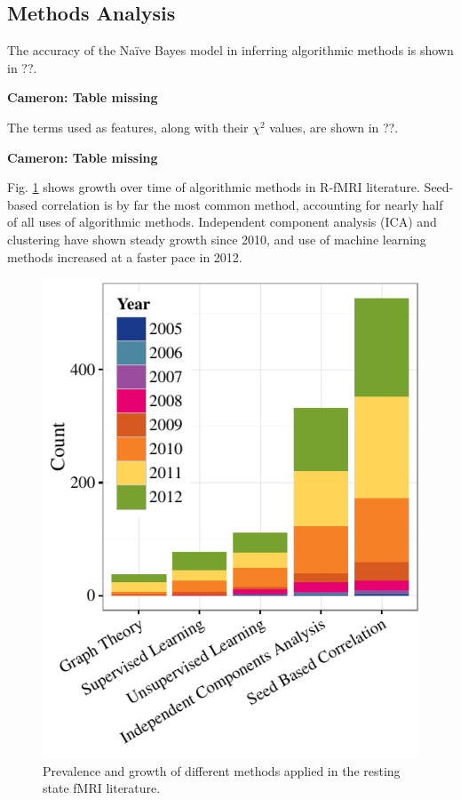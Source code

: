 \documentclass[12pt,5p]{elsarticle}
\newcommand\MyCBox[1]{%
  \colorbox{yellow!60}{\begin{varwidth}{\dimexpr\linewidth-2\fboxsep}#1\end{varwidth}}}
\newcommand{\COMMENTCC}[1]{\MyCBox{\textcolor{cc_commentcolor}{\textbf{Cameron:
#1}}}}
\begin{document}
\subsection{Methods Analysis}

The accuracy of the Na\"ive Bayes model in inferring
algorithmic methods is shown in ??. \COMMENTCC{Table missing}

The terms used as features, along with their $\chi^2$ values, are shown in
??. \COMMENTCC{Table missing}

Fig. \ref{fig:methods_growth_hist} shows growth over time of algorithmic
methods in R-fMRI literature.  Seed-based correlation is by far the most
common method, accounting for nearly half of all uses of algorithmic
methods. Independent component analysis (ICA) and clustering have shown
steady growth since 2010, and use of machine learning methods increased at
a faster pace in 2012.

\begin{figure}
  \begin{center}
    \includegraphics[]{figures/methods_growth_hist}%
    \caption{Prevalence and growth of different methods applied in the resting
    state fMRI literature. 
        \label{fig:methods_growth_hist}
    }
  \end{center}
\end{figure}
\end{document}
